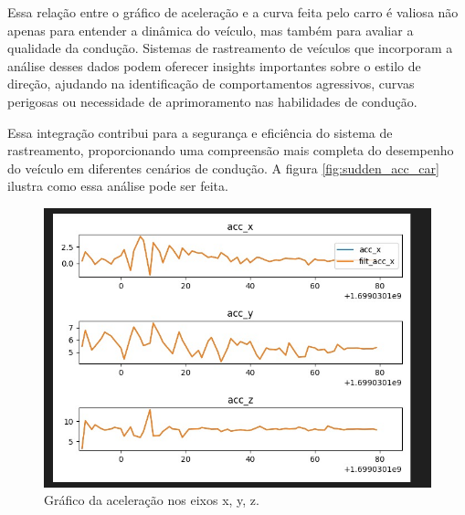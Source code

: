 Essa relação entre o gráfico de aceleração e a curva feita pelo carro é valiosa não apenas para entender a dinâmica do veículo, mas também para avaliar a qualidade da condução. Sistemas de rastreamento de veículos que incorporam a análise desses dados podem oferecer insights importantes sobre o estilo de direção, ajudando na identificação de comportamentos agressivos, curvas perigosas ou necessidade de aprimoramento nas habilidades de condução. 

Essa integração contribui para a segurança e eficiência do sistema de rastreamento, proporcionando uma compreensão mais completa do desempenho do veículo em diferentes cenários de condução. A figura \ref{fig:sudden_acc_car} ilustra como essa análise pode ser feita.

\begin{figure}[hp]
    \centering
    
    \includegraphics[scale=0.4]{figures/aceleracao.jpg}
    
    \caption{Gráfico da aceleração nos eixos x, y, z.}
    
    \label{fig:aceleracao}
\end{figure}

